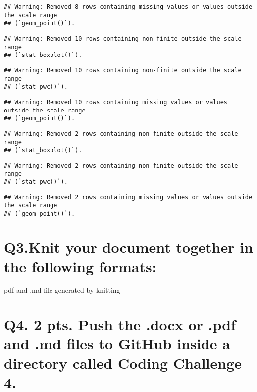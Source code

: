 \documentclass[
]{article}
\begin{document}
\begin{verbatim}
## Warning: Removed 8 rows containing missing values or values outside the scale range
## (`geom_point()`).
\end{verbatim}

\begin{verbatim}
## Warning: Removed 10 rows containing non-finite outside the scale range
## (`stat_boxplot()`).
\end{verbatim}

\begin{verbatim}
## Warning: Removed 10 rows containing non-finite outside the scale range
## (`stat_pwc()`).
\end{verbatim}

\begin{verbatim}
## Warning: Removed 10 rows containing missing values or values outside the scale range
## (`geom_point()`).
\end{verbatim}

\begin{verbatim}
## Warning: Removed 2 rows containing non-finite outside the scale range
## (`stat_boxplot()`).
\end{verbatim}

\begin{verbatim}
## Warning: Removed 2 rows containing non-finite outside the scale range
## (`stat_pwc()`).
\end{verbatim}

\begin{verbatim}
## Warning: Removed 2 rows containing missing values or values outside the scale range
## (`geom_point()`).
\end{verbatim}

\section{Q3.Knit your document together in the following
formats:}\label{q3.knit-your-document-together-in-the-following-formats}

pdf and .md file generated by knitting

\section{Q4. 2 pts. Push the .docx or .pdf and .md files to GitHub
inside a directory called Coding Challenge
4.}\label{q4.-2-pts.-push-the-.docx-or-.pdf-and-.md-files-to-github-inside-a-directory-called-coding-challenge-4.}
\end{document}
